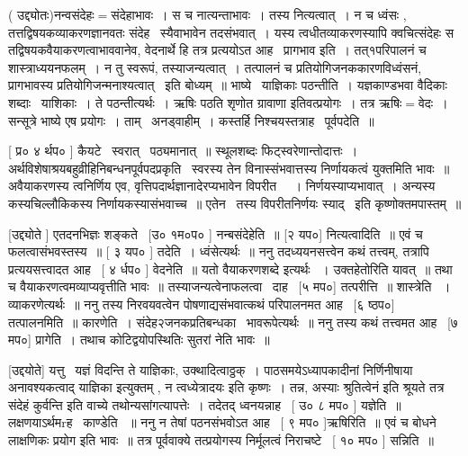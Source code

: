\documentclass[11pt, openany]{book}
\begin{document}
 ( उद्द्योतः)नन्वसंदेहः$=$संदेहाभावः~। स च नात्यन्ताभावः~। तस्य
नित्यत्वात्~। न च ध्वंसः , तत्तद्विषयकव्याकरणज्ञानवतः संदेह \textendash\ स्यैवाभावेन
तदसंभवात्~। यस्य त्वधीतव्याकरणस्यापि क्वचित्संदेहः स
तद्विषयकवैयाकरणत्वाभाववानेव, वेदनार्थे हि तत्र प्रत्ययोऽत
आह \textendash\ प्रागभाव इति~। तत्१परिपालनं च शास्त्राध्ययनफलम्~। न तु स्वरूपं,
तस्याजन्यत्वात्~। तत्पालनं च प्रतियोगिजनककारणविध्वंसनं, प्रागभावस्य
प्रतियोगिजन्मनाश्यत्वात् \textendash\ इति बोध्यम्~॥ भाष्ये \textendash\ याज्ञिकाः पठन्तीति~। 
यज्ञकाण्डभवा वैदिकाः शब्दाः \textendash\ याशिकाः~। ते पठन्तीत्यर्थः~। ऋषिः पठति
{\qt शृणोत ग्रावाणा} इतिवत्प्रयोगः~। तत्र ऋषिः$=$वेदः~। सन्सूत्रे भाष्ये एष
प्रयोगः~। ताम् \textendash\ अनड्वाहीम्~। कस्तर्हि निश्चयस्तत्राह \textendash\ पूर्वपदेति~॥ 



 [ प्र० ४ र्थप० ] कैयटे \textendash\ स्वरात् \textendash\ पठ्यमानात्~॥ स्थूलशब्दः
फिट्स्वरेणान्तोदात्तः~। अर्थविशेषाश्रयबहुव्रीहिनिबन्धनपूर्वपदप्रकृति \textendash\ 
स्वरस्य तेन विनास्संभवात्तस्य निर्णायकत्वं युक्तमिति भावः~॥ अवैयाकरणस्य
त्वनिर्णिय एव, वृत्तिपदार्थज्ञानादेरप्यभावेन विपरीत \textendash\ ~। 
निर्णयस्याप्यभावात्~। अन्यस्य कस्यचिल्लौकिकस्य निर्णायकस्यासंभवाच्च~॥
एतेन \textendash\ तस्य विपरीतनिर्णयः स्याद् \textendash\ इति कृष्णोक्तमपास्तम्~॥ 

 [उद्द्योते ] एतदनभिज्ञः शङ्कते \textendash\ [उ० १म०प० ] नन्बसंदेहेति~॥
[२ यप०] नित्यत्वादिति~॥ एवं च फलत्वासंभवस्तस्य~॥ [ ३ यप० ]
तदेति~। ध्वंसेत्यर्थः~॥ ननु तदध्ययनसत्त्वेन कथं तत्त्वम्, तत्रापि
प्रत्ययसत्त्वादत आह \textendash\ [ ४ र्धप० ] वेदनेति~॥ यतो वैयाकरणशब्दे इत्यर्थः
~। उक्तहेतोरिति यावत्~॥ तथा च वैयाकरणत्वमव्याप्यवृत्तीति भावः~॥
तस्याजन्यत्वेनाफलत्वा \textendash\ दाह \textendash\ [५ मप०] तत्परीत्ति~॥ शास्त्रेति
~। व्याकरणेत्यर्थः~॥ ननु तस्य निरवयवत्वेन पोषणाद्यसंभवात्कथं परिपालनमत
आह \textendash\ [६ ष्ठप०] तत्पालनमिति~॥ कारणेति~। संदेह२जनकप्रतिबन्धका \textendash\ 
भावरूपेत्यर्थः~॥ ननु तस्य कथं तत्त्वमत आह \textendash\ [७ मप०] प्रागेति~। तथाच
कोटिद्वयोपस्थितिः सुतरां नेति भावः~॥ 

 [उद्दयोते] यत्तु \textendash\ {\qt यज्ञं विदन्ति ते याज्ञिकाः}, उक्थादित्वाठ्ठक्~। 
पाठसमयेऽध्यापकादीनां निर्णिनीषाया अनावश्यकत्वाद् याज्ञिका इत्युक्तम् , न
{\qt त्वध्येत्रादयः} इति कृष्णः~। तन्न, अस्याः श्रुतित्वेनं {\qt इति श्रूयते
तत्र संदेहं कुर्वन्ति} इति वाच्ये तथोन्यसांगत्यापत्तेः~। तदेतद्
ध्वनयन्नाह \textendash\ [ उ० ८ मप० ] यज्ञेति~॥ लक्षणयाऽर्थमrह \textendash\ काण्डेति
~॥ ननु न तेषां पठनसंभवोऽत आह \textendash\ [ ९ मप० ]ऋषिरिति~॥ एवं च बोधने
लाक्षणिकः प्रयोग इति भावः~॥ तत्र पूर्ववाक्ये तत्प्रयोगस्य निर्मूलत्वं
निराचष्टे \textendash\ [ १० मप० ] सन्निति~॥ 
\end{document}
